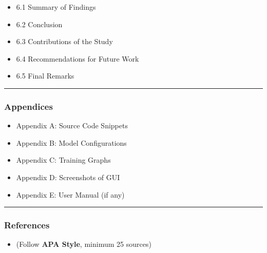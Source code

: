 \documentclass[
  12pt,
  oneside]{article}
\providecommand{\tightlist}{%
  \setlength{\itemsep}{0pt}\setlength{\parskip}{0pt}}
\begin{document}
\begin{itemize}
\tightlist
\item
  6.1 Summary of Findings
\item
  6.2 Conclusion
\item
  6.3 Contributions of the Study
\item
  6.4 Recommendations for Future Work
\item
  6.5 Final Remarks
\end{itemize}

\begin{center}\rule{0.5\linewidth}{0.5pt}\end{center}

\subsubsection{Appendices}\label{appendices}

\begin{itemize}
\tightlist
\item
  Appendix A: Source Code Snippets
\item
  Appendix B: Model Configurations
\item
  Appendix C: Training Graphs
\item
  Appendix D: Screenshots of GUI
\item
  Appendix E: User Manual (if any)
\end{itemize}

\begin{center}\rule{0.5\linewidth}{0.5pt}\end{center}

\subsubsection{References}\label{references}

\begin{itemize}
\tightlist
\item
  (Follow \textbf{APA Style}, minimum 25 sources)
\end{itemize}
\end{document}
